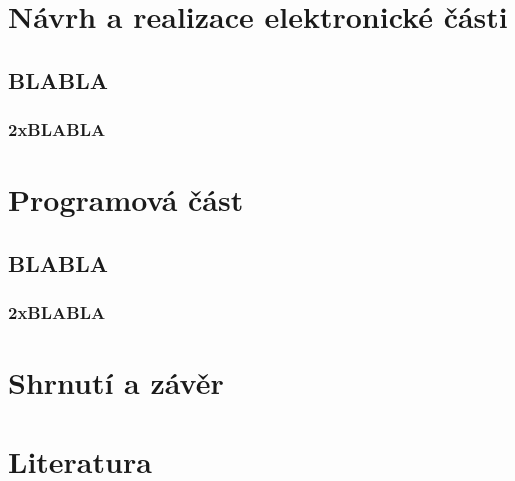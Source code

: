 \documentclass[12pt,oneside]{book} %
\begin{document}
\part{Návrh a realizace elektronické části}\label{elektro}

\chapter{BLABLA}\label{BLABLA}
\section{2xBLABLA}\label{2xBLABLA}

\part{Programová část}\label{program}

\chapter{BLABLA}\label{BLABLA}
\section{2xBLABLA}\label{2xBLABLA}

\part{Shrnutí a závěr}\label{shrnuti}

\part{Literatura}\label{literatura}
\end{document}
